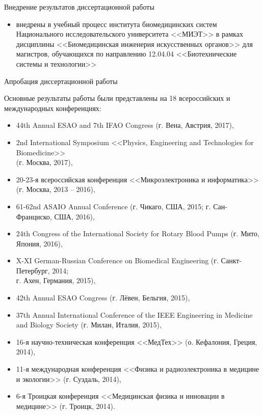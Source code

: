 \documentclass[a4paper, 9pt]{beamer}
\begin{document}
\begin{frame}{Внедрение результатов диссертационной работы}
\begin{minipage}[ht]{0.52\textwidth}
\end{minipage}
\scriptsize
\begin{itemize}
 \item внедрены в учебный процесс института биомедицинских систем Национального исследовательского университета <<МИЭТ>> в рамках дисциплины <<Биомедицинская инженерия искусственных органов>> для магистров, обучающихся по направлению 12.04.04 <<Биотехнические системы и технологии>>
\end{itemize}
\end{frame}


\begin{frame}{Апробация диссертационной работы}
\footnotesize

Основные результаты работы были представлены на 18 всероссийских и международных конференциях:

\begin{itemize}
 \item 44th Annual ESAO and 7th IFAO Congress (г. Вена, Австрия, 2017),
 \item 2nd International Symposium <<Physics, Engineering and Technologies for Biomedicine>> \\(г. Москва, 2017),
 \item 20-23-я всероссийская конференция <<Микроэлектроника и информатика>> (г. Москва, 2013 -- 2016),
 \item 61-62nd ASAIO Annual Conference (г. Чикаго, США, 2015; г. Сан-Франциско, США, 2016),
 \item 24th Congress of the International Society for Rotary Blood Pumps (г. Мито, Япония, 2016),
 \item X-XI German-Russian Conference on Biomedical Engineering (г. Санкт-Петербург, 2014; \\г. Ахен, Германия, 2015),
 \item 42th Annual ESAO Congress (г. Лёвен, Бельгия, 2015),
 \item 37th Annual International Conference of the IEEE Engineering in Medicine and Biology Society (г. Милан, Италия, 2015),
 \item 16-я научно-техническая конференция <<МедТех>> (о. Кефалония, Греция, 2014),
 \item 11-я международная конференция <<Физика и радиоэлектроника в медицине и экологии>> (г. Суздаль, 2014),
 \item 6-я Троицкая конференция <<Медицинская физика и инновации в медицине>> (г. Троицк, 2014).
\end{itemize}

\end{frame}
\end{document}
